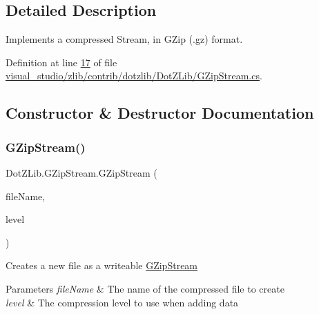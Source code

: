\subsection{Detailed Description}
Implements a compressed Stream, in G\+Zip (.gz) format. 



Definition at line \hyperlink{visual__studio_2zlib_2contrib_2dotzlib_2_dot_z_lib_2_g_zip_stream_8cs_source_l00017}{17} of file \hyperlink{visual__studio_2zlib_2contrib_2dotzlib_2_dot_z_lib_2_g_zip_stream_8cs_source}{visual\+\_\+studio/zlib/contrib/dotzlib/\+Dot\+Z\+Lib/\+G\+Zip\+Stream.\+cs}.



\subsection{Constructor \& Destructor Documentation}
\mbox{\label{class_dot_z_lib_1_1_g_zip_stream_a12d73ef46491a5023b1fd620efb13f1a}} 
\subsubsection{\texorpdfstring{G\+Zip\+Stream()}{GZipStream()}\hspace{0.1cm}{\footnotesize\ttfamily [1/4]}}
{\footnotesize\ttfamily Dot\+Z\+Lib.\+G\+Zip\+Stream.\+G\+Zip\+Stream (\begin{DoxyParamCaption}\item[{string}]{file\+Name,  }\item[{\hyperlink{namespace_dot_z_lib_a034f7a1ef9856d8834e6f6b1c53d8a4c}{Compress\+Level}}]{level }\end{DoxyParamCaption})\hspace{0.3cm}{\ttfamily [inline]}}



Creates a new file as a writeable \hyperlink{class_dot_z_lib_1_1_g_zip_stream}{G\+Zip\+Stream} 


\begin{DoxyParams}{Parameters}
{\em file\+Name} & The name of the compressed file to create\\
\hline
{\em level} & The compression level to use when adding data\\
\hline
\end{DoxyParams}

